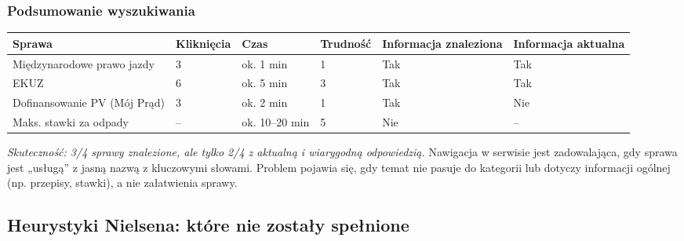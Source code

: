 \documentclass[11pt,a4paper]{article}
\begin{document}
\subsubsection*{Podsumowanie wyszukiwania}

{\small
\begin{tabularx}{\textwidth}{@{}YC{1.8cm}C{1.9cm}C{1.5cm}C{2cm}C{2cm}@{}}
\toprule
Sprawa & Kliknięcia & Czas & Trudność & Informacja znaleziona & Informacja aktualna \\
\midrule
Międzynarodowe prawo jazdy & 3 & ok. 1 min & 1 & Tak & Tak \\
EKUZ & 6 & ok. 5 min & 3 & Tak & Tak \\
Dofinansowanie PV (Mój Prąd) & 3 & ok. 2 min & 1 & Tak & Nie \\
Maks. stawki za odpady & -- & ok. 10--20 min & 5 & Nie & -- \\
\bottomrule
\end{tabularx}
}

\textit{Skuteczność: 3/4 sprawy znalezione, ale tylko 2/4 z aktualną i wiarygodną odpowiedzią.} Nawigacja w serwisie jest zadowalająca, gdy sprawa jest „usługą” z jasną nazwą z kluczowymi słowami. Problem pojawia się, gdy temat nie pasuje do kategorii lub dotyczy informacji ogólnej (np. przepisy, stawki), a nie załatwienia sprawy.

\subsection{Heurystyki Nielsena: które nie zostały spełnione}
\end{document}
